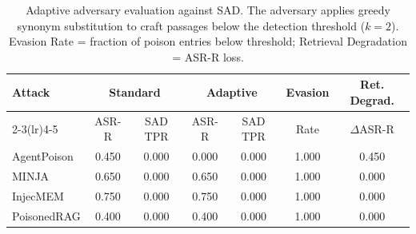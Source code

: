 \begin{table}[t]
\centering
\small
\caption{Adaptive adversary evaluation against SAD. The adversary applies greedy synonym substitution to craft passages below the detection threshold ($k=2$). Evasion Rate = fraction of poison entries below threshold; Retrieval Degradation = ASR-R loss.}
\label{tab:adaptive_sad}
\begin{tabular}{lcccccc}
\toprule
Attack & \multicolumn{2}{c}{Standard} & \multicolumn{2}{c}{Adaptive} & Evasion & Ret. Degrad. \\
\cmidrule(lr){2-3}\cmidrule(lr){4-5}
 & ASR-R & SAD TPR & ASR-R & SAD TPR & Rate & $\Delta$ASR-R \\
\midrule
AgentPoison & 0.450 & 0.000 & 0.000 & 0.000 & 1.000 & 0.450 \\
MINJA & 0.650 & 0.000 & 0.650 & 0.000 & 1.000 & 0.000 \\
InjecMEM & 0.750 & 0.000 & 0.750 & 0.000 & 1.000 & 0.000 \\
PoisonedRAG & 0.400 & 0.000 & 0.400 & 0.000 & 1.000 & 0.000 \\
\bottomrule
\end{tabular}
\end{table}
